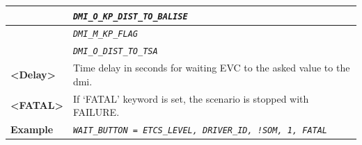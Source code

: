 \begin{itemize}
\begin{longtable}{|l|l|}
				\hline

				&	\begin{minipage}[t]{0.78\linewidth} \emph{\texttt{DMI\_O\_KP\_DIST\_TO\_BALISE}} \end{minipage} \\

				\hline

				&	\begin{minipage}[t]{0.78\linewidth} \emph{\texttt{DMI\_M\_KP\_FLAG}} \end{minipage} \\

				\hline

				&	\begin{minipage}[t]{0.78\linewidth} \emph{\texttt{DMI\_O\_DIST\_TO\_TSA}} \end{minipage} \\

				\hline

					\begin{minipage}[t]{0.22\linewidth} \textbf{<Delay>} \end{minipage}
				&	\begin{minipage}[t]{0.78\linewidth} Time delay in seconds for waiting EVC to the asked value to the dmi. \end{minipage} \\

				\hline

					\begin{minipage}[t]{0.22\linewidth} \textbf{<FATAL>} \end{minipage}
				&	\begin{minipage}[t]{0.78\linewidth} If ‘FATAL’ keyword is set, the scenario is stopped with FAILURE.  \end{minipage} \\

				\hline

					\begin{minipage}[t]{0.22\linewidth} \textbf{Example} \end{minipage}
				&	\begin{minipage}[t]{0.78\linewidth} \emph{\texttt{WAIT\_BUTTON = ETCS\_LEVEL, DRIVER\_ID, !SOM, 1, FATAL}} \end{minipage} \\

				\hline \hline

			\end{longtable}
\end{itemize}


